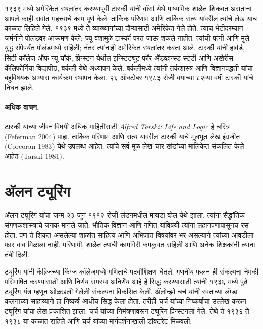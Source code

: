 १९३९ मध्ये अमेरिकेत स्थलांतर करण्यापूर्वी टार्स्की यांनी वॉर्सा येथे माध्यमिक शाळेत शिकवत असताना आपले काही सर्वात महत्त्वाचे काम पूर्ण केले. तार्किक परिणाम आणि तार्किक सत्य यांवरील त्यांचे लेख याच काळात लिहिले गेले. १९३९ मध्ये ते व्याख्यानांच्या दौऱ्यासाठी अमेरिकेत गेले होते. त्याच भेटीदरम्यान जर्मनीने पोलंडवर आक्रमण केले; ज्यू वंशामुळे टार्स्की परत जाऊ शकले नाहीत. त्यांची पत्नी आणि मुले युद्ध संपेपर्यंत पोलंडमध्ये राहिली; नंतर त्यांनाही अमेरिकेत स्थलांतर करता आले. टार्स्की यांनी हार्वर्ड, सिटी कॉलेज ऑफ न्यू यॉर्क, प्रिन्स्टन येथील इन्स्टिट्यूट फॉर ॲडव्हान्स्ड स्टडी आणि अखेरीस कॅलिफोर्निया विद्यापीठ, बर्कली येथे अध्यापन केले. बर्कलीमध्ये त्यांनी तर्कशास्त्र आणि विज्ञानपद्धती यांचा बहुविषयक अभ्यास कार्यक्रम स्थापन केला. २६ ऑक्टोबर १९८३ रोजी वयाच्या ८२व्या वर्षी टार्स्की यांचे निधन झाले.

\paragraph{अधिक वाचन.}
टार्स्की यांच्या जीवनाविषयी अधिक माहितीसाठी \emph{Alfred Tarski: Life
  and Logic} हे चरित्र (Feferman 2004) पाहा. तार्किक परिणाम आणि सत्य यांवरील टार्स्की यांचे मूलभूत लेख इंग्रजीत (Corcoran 1983) येथे उपलब्ध आहेत. त्यांचे सर्व मूळ लेख चार खंडांच्या मालिकेत संकलित केले आहेत (Tarski 1981).














\section{ॲलन ट्यूरिंग}\label{his:bio:tur:sec}

ॲलन ट्यूरिंग यांचा जन्म २३ जून १९१२ रोजी लंडनमधील मायडा व्हेल येथे झाला. त्यांना सैद्धांतिक संगणकशास्त्राचे जनक मानले जाते. भौतिक विज्ञान आणि गणित यांविषयी त्यांना लहानपणापासूनच रस होता. पण ते शिकत असलेल्या शाळांत साहित्य आणि अभिजात विषयांवर भर असल्याने त्यांच्या आवडीला फार वाव मिळाला नाही. परिणामी, शाळेत त्यांची कामगिरी कमकुवत राहिली आणि अनेक शिक्षकांनी त्यांना तंबी दिली.



ट्यूरिंग यांनी केंब्रिजच्या किंग्ज कॉलेजमध्ये गणिताचे पदवीशिक्षण घेतले. गणनीय फलन ही संकल्पना नेमकी परिभाषित करण्यासाठी आणि निर्णय समस्या अनिर्णेय आहे हे सिद्ध करण्यासाठी त्यांनी १९३६ मध्ये पुढे ट्यूरिंग यंत्र म्हणून ओळखली गेलेली संकल्पना विकसित केली. ॲलोन्झो चर्च यांनी स्वतःच्या लॅम्डा कलनाच्या साहाय्याने हा निष्कर्ष आधीच सिद्ध केला होता. तरीही चर्च यांच्या निष्कर्षाचा उल्लेख करून ट्यूरिंग यांचा लेख प्रकाशित झाला. चर्च यांच्या निमंत्रणावरून ट्यूरिंग प्रिन्स्टनला गेले. तेथे ते १९३६ ते १९३८ या काळात राहिले आणि चर्च यांच्या मार्गदर्शनाखाली डॉक्टरेट मिळवली.

